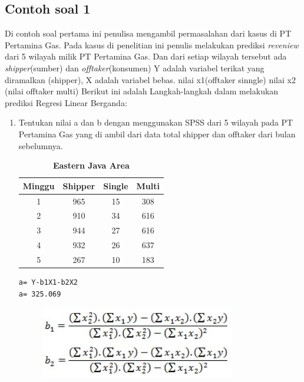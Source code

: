 \subsection{Contoh soal 1}
\par Di contoh soal pertama ini penulisa mengambil permasalahan dari kasus di PT Pertamina Gas. Pada kasus di penelitian ini penulis melakukan prediksi \textit{reveniew} dari 5 wilayah milik PT Pertamina Gas. Dan dari setiap wilayah tersebut ada \textit{shipper}(sumber) dan \textit{offtaker}(konsumen)
	Y adalah variabel terikat yang diramalkan (shipper), X adalah variabel bebas. nilai x1(offtaker sinngle) nilai x2 (nilai offtaker multi)\citep{hijriani2017implementasi}
Berikut ini adalah Langkah-langkah dalam melakukan prediksi Regresi Linear Berganda:\citep{analisisrls}
\begin{enumerate}
    \item 	Tentukan nilai a dan b dengan menggunakan SPSS dari 5 wilayah pada PT Pertamina Gas yang di ambil dari data total shipper dan offtaker dari bulan sebelumnya.
     \vspace{9cm}
  \begin{table}[]
  \captionsetup{singlelinecheck=off}
  \caption{\textbf{Eastern Java Area}}
\begin{tabular}{|c|c|c|c|}
\hline
Minggu & Shipper & Single & Multi \\ \hline
1      & 965     & 15     & 308   \\ \hline
2      & 910     & 34     & 616   \\ \hline
3      & 944     & 27     & 616   \\ \hline
4      & 932     & 26     & 637   \\ \hline
5      & 267     & 10     & 183   \\ \hline
\end{tabular}
\end{table}
\newpage \begin{lstlisting}
a= Y-b1X1-b2X2      
a= 325.069
\end{lstlisting}
\begin{figure}[!htbp]
\includegraphics[scale=0.6]{chapters/figures/b1b2.JPG}
    \label{Figure4}
\end{figure}

\end{enumerate}
